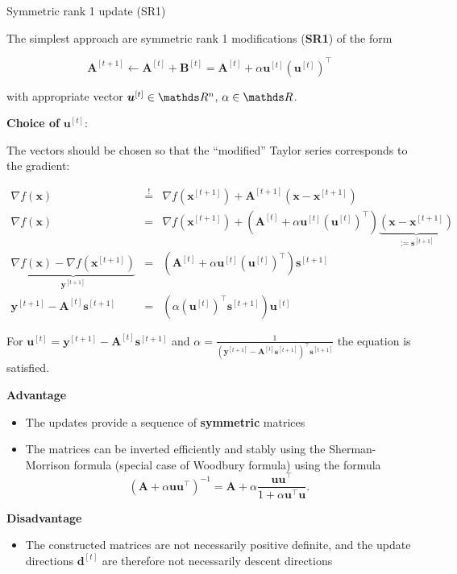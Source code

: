 \documentclass[11pt,compress,t,notes=noshow, xcolor=table]{beamer}
\begin{document}
\begin{vbframe}{Symmetric rank 1 update (SR1)}

The simplest approach are symmetric rank 1 modifications (\textbf{SR1}) of the form

$$
\bm{A}^{[t+1]} \leftarrow \bm{A}^{[t]} + \bm{B}^{[t]} = \bm{A}^{[t]} + \alpha \bm{u}^{[t]}(\bm{u}^{[t]})^{\top}
$$

with appropriate vector $\bm{u}^{[t]} \in \R^n$, $\alpha \in \R$.


\framebreak

\textbf{Choice of} $\bm{u}^{[t]}$:

The vectors should be chosen so that the \enquote{modified} Taylor series corresponds to the gradient:

\begin{eqnarray*}
\nabla f(\mathbf{x}) &\overset{!}{=}& \nabla f(\mathbf{x}^{[t+1]}) +
\bm{A}^{[t+1]}(\mathbf{x} - \mathbf{x}^{[t+1]}) \\
\nabla f(\mathbf{x}) &=& \nabla f(\mathbf{x}^{[t+1]}) +  \left(\bm{A}^{[t]} +
\alpha \bm{u}^{[t]}(\bm{u}^{[t]})^\top\right)\underbrace{(\mathbf{x} - \mathbf{x}^{[t+1]})}_{:= \bm{s}^{[t+1]}} \\
\underbrace{\nabla f(\mathbf{x}) - \nabla f(\mathbf{x}^{[t+1]})}_{\bm{y}^{[t+1]}} &=& \left(\bm{A}^{[t]} + \alpha \bm{u}^{[t]} (\bm{u}^{[t]})^{\top}\right) \bm{s}^{[t+1]} \\
\bm{y}^{[t+1]} - \bm{A}^{[t]} \bm{s}^{[t+1]} &=& \left(\alpha (\bm{u}^{[t]})^{\top} \bm{s}^{[t+1]}\right) \bm{u}^{[t]}
\end{eqnarray*}

For $\bm{u}^{[t]} = \bm{y}^{[t+1]} - \bm{A}^{[t]} \bm{s}^{[t+1]}$ and $\alpha = \frac{1}{\left(\bm{y}^{[t+1]} - \bm{A}^{[t]}\bm{s}^{[t+1]}\right)^\top\bm{s}^{[t+1]}}$ the equation is satisfied.

\framebreak

\textbf{Advantage}
\begin{itemize}
\item The updates provide a sequence of \textbf{symmetric} matrices
\item The matrices can be inverted efficiently and stably using the Sherman-Morrison formula (special case of Woodbury formula) using the formula
$$
(\bm{A} + \alpha \bm{u}\bm{u}^{\top})^{-1} = \bm{A} + \alpha \frac{\bm{u}\bm{u}^{\top}}{1 + \alpha\bm{u}^\top\bm{u}}.
$$
\end{itemize}

\textbf{Disadvantage}
\begin{itemize}
\item The constructed matrices are not necessarily positive definite, and the update directions $\bm{d}^{[t]}$ are therefore not necessarily descent directions
\end{itemize}

\end{vbframe}
\end{document}
